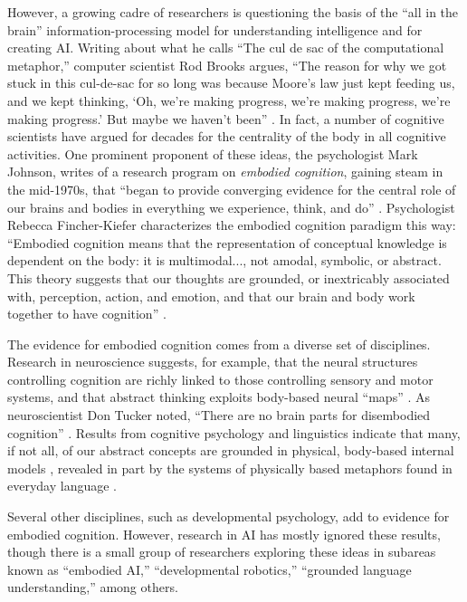 \documentclass[12pt]{article}
\begin{document}
However, a growing cadre of researchers is questioning the basis of the ``all in the brain'' information-processing model for understanding intelligence and for creating AI.  Writing about what he calls ``The cul de sac of the computational metaphor,'' computer scientist Rod Brooks argues, ``The reason for why we got stuck in this cul-de-sac for so long was because Moore's law just kept feeding us, and we kept thinking, `Oh, we're making progress, we're making progress, we're making progress.' But maybe we haven't been'' \cite{Edge2019}.  In fact, a number of cognitive scientists have argued for decades for the centrality of the body in all cognitive activities.  One prominent proponent of these ideas, the psychologist Mark Johnson, writes of a research program on \textit{embodied cognition}, gaining steam in the mid-1970s, that ``began to provide converging evidence for the central role of our brains and bodies in everything we experience, think, and do'' \cite{Johnson2017}. Psychologist Rebecca Fincher-Kiefer characterizes the embodied cognition paradigm this way:  ``Embodied cognition means that the representation of conceptual knowledge is dependent on the body: it is multimodal..., not amodal, symbolic, or abstract.  This theory suggests that our thoughts are grounded, or inextricably associated with, perception, action, and emotion, and that our brain and body work together to have cognition'' \cite{Fincher2019}.

The evidence for embodied cognition comes from a diverse set of disciplines.  Research in neuroscience suggests, for example, that the neural structures controlling cognition are richly linked to those controlling sensory and motor systems, and that abstract thinking exploits body-based neural ``maps'' \cite{Epstein2017}.  As neuroscientist Don Tucker noted, ``There are no brain parts for disembodied cognition'' \cite{Tucker2007}. Results from cognitive psychology and linguistics indicate that many, if not all, of our abstract concepts are grounded in physical, body-based internal models \cite{Barsalou2005}, revealed in part by the systems of physically based metaphors found in everyday language \cite{Lakoff2008}.

Several other disciplines, such as developmental psychology, add to evidence for embodied cognition.  However, research in AI has mostly ignored these results, though there is a small group of researchers exploring these ideas in subareas known as ``embodied AI,'' ``developmental robotics,'' ``grounded language understanding,'' among others. 
\end{document}
